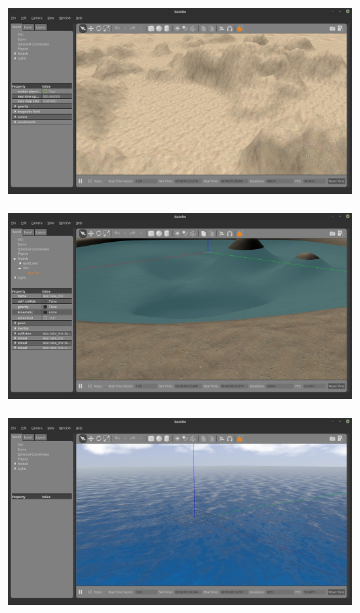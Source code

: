 \begin{figure}[H]
    \centering
    \begin{subfigure}[t]{0.47\textwidth}
        \includegraphics[width=\textwidth]{dados/figuras/gazebo1.jpeg}
    \end{subfigure}
    \begin{subfigure}[t]{0.47\textwidth}
        \includegraphics[width=\textwidth]{dados/figuras/gazebo2.jpeg}
    \end{subfigure}
    \begin{subfigure}[t]{0.47\textwidth}
        \includegraphics[width=\textwidth]{dados/figuras/gazebo3.jpeg}

\end{subfigure}
\end{figure}
